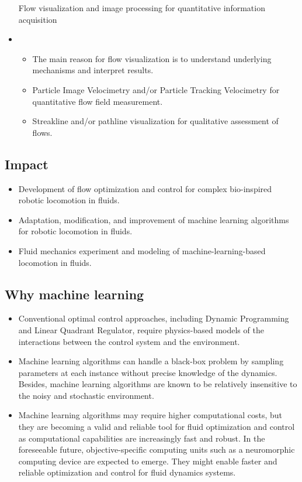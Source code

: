 \documentclass[12pt, a4paper]{article}
\providecommand{\tightlist}{%
  \setlength{\itemsep}{0pt}\setlength{\parskip}{0pt}}
\begin{document}
\begin{itemize}
  Flow visualization and image processing for quantitative information
  acquisition
\item
  \begin{itemize}
  \tightlist
  \item
    The main reason for flow visualization is to understand underlying
    mechanisms and interpret results.
  \item
    Particle Image Velocimetry and/or Particle Tracking Velocimetry for
    quantitative flow field measurement.
  \item
    Streakline and/or pathline visualization for qualitative assessment
    of flows.
  \end{itemize}
\end{itemize}

\hypertarget{impact}{%
\subsection{Impact}\label{impact}}

\begin{itemize}
\tightlist
\item
  Development of flow optimization and control for complex bio-inspired
  robotic locomotion in fluids.
\item
  Adaptation, modification, and improvement of machine learning
  algorithms for robotic locomotion in fluids.
\item
  Fluid mechanics experiment and modeling of machine-learning-based
  locomotion in fluids.
\end{itemize}

\hypertarget{why-machine-learning}{%
\subsection{Why machine learning}\label{why-machine-learning}}

\begin{itemize}
\tightlist
\item
  Conventional optimal control approaches, including Dynamic Programming
  and Linear Quadrant Regulator, require physics-based models of the
  interactions between the control system and the environment.
\item
  Machine learning algorithms can handle a black-box problem by sampling
  parameters at each instance without precise knowledge of the dynamics.
  Besides, machine learning algorithms are known to be relatively
  insensitive to the noisy and stochastic environment.
\item
  Machine learning algorithms may require higher computational costs,
  but they are becoming a valid and reliable tool for fluid optimization
  and control as computational capabilities are increasingly fast and
  robust. In the foreseeable future, objective-specific computing units
  such as a neuromorphic computing device are expected to emerge. They
  might enable faster and reliable optimization and control for fluid
  dynamics systems.
\end{itemize}
\end{document}
